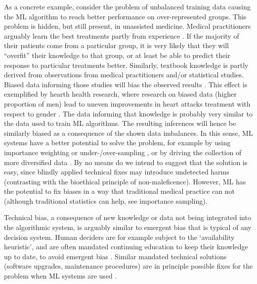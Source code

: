     As a concrete example, consider the problem of unbalanced training data causing the ML algorithm to reach better performance on over-represented groups.
    This problem is hidden, but still present, in unassisted medicine.
    Medical practitioners arguably learn the best treatments partly from experience \cite{Zerilli2019}.
    If the majority of their patients come from a particular group, it is very likely that they will ``overfit'' their knowledge to that group, or at least be able to predict their response to particular treatments better.
    Similarly, textbook knowledge is partly derived from observations from medical practitioners and/or statistical studies.
    Biased data informing those studies will bias the observed results \cite{Chen2021}.
    This effect is exemplified by hearth health research, where research on biased data (higher proportion of men) lead to uneven improvements in heart attacks treatment with respect to gender \cite{Mccradden2020}.
    The data informing that knowledge is probably very similar to the data used to train ML algorithms.
    The resulting inferences will hence be similarly biased as a consequence of the shown data imbalances.
    In this sense, ML systems have a better potential to solve the problem, for example by using importance weighting or under-/over-sampling \cite{Chen2021}, or by driving the collection of more diversified data \cite{Zerilli2019}.
    By no means do we intend to suggest that the solution is easy, since blindly applied technical fixes may introduce undetected harms (contrasting with the bioethical principle of non-maleficence).
    However, ML has the potential to fix biases in a way that traditional medical practice can not \cite{Mccradden2020} (although traditional statistics can help, see \eg importance sampling).

    Technical bias, a consequence of new knowledge or data not being integrated into the algorithmic system, is arguably similar to emergent bias that is typical of any decision system.
    Human deciders are for example subject to the `availability heuristic', and are often mandated continuing education to keep their knowledge up to date, to avoid emergent bias \cite{Zerilli2019}.
    Similar mandated technical solutions (software upgrades, maintenance procedures) are in principle possible fixes for the problem when ML systems are used \cite{Zerilli2019}.

